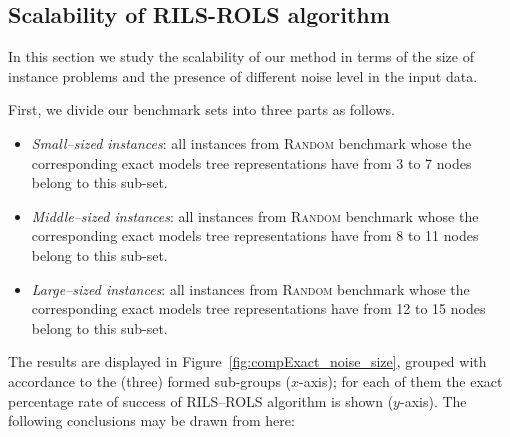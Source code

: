 \documentclass[a4paper,12pt]{elsarticle}
\begin{document}
\subsection{Scalability of \textsc{RILS}-\textsc{ROLS} algorithm}\label{sec:scalability-rils-rols}

In this section we study the scalability of our method in terms of the size of  instance problems and  the presence of different noise level in the input data. 

First, we divide our benchmark sets into three parts as follows. 
\begin{itemize}
	\item \textit{Small--sized instances}: all instances from \textsc{Random} benchmark whose the corresponding exact models tree representations have from 3 to 7 nodes belong to this sub-set.
	\item \textit{Middle--sized instances}:  all instances from \textsc{Random} benchmark whose the corresponding exact models tree representations have from 8 to 11 nodes belong to this sub-set.
	\item \textit{Large--sized instances}: all instances from \textsc{Random} benchmark whose the corresponding exact models tree representations have from 12 to 15 nodes belong to this sub-set. 
\end{itemize}

The results are displayed in Figure~\ref{fig:compExact_noise_size}, grouped with accordance to the (three) formed sub-groups ($x$-axis); for each of them the exact percentage rate of success of \textsc{RILS}--\textsc{ROLS} algorithm is shown ($y$-axis). The following conclusions may be drawn from here:
\end{document}
